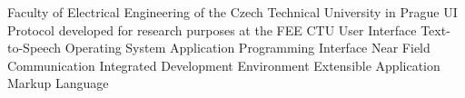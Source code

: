  Faculty of Electrical Engineering of the Czech Technical University in Prague
\abbrv[UIP]  UI Protocol developed for research purposes at the FEE CTU
\abbrv[UI]  User Interface
\abbrv[TTS]  Text-to-Speech
\abbrv[OS]  Operating System
\abbrv[API]  Application Programming Interface
\abbrv[NFC]  Near Field Communication
\abbrv[IDE]  Integrated Development Environment
\abbrv[XAML] Extensible Application Markup Language
\stopAbbreviations

\endinput
